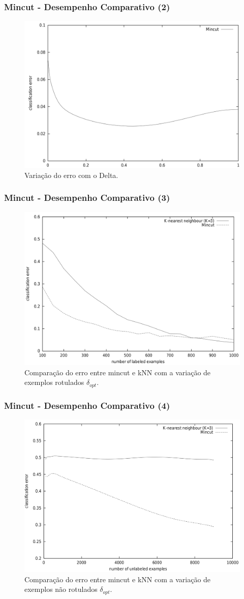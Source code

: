 \documentclass{beamer}
\begin{document}
    \frame
    {
      \frametitle{Mincut - Desempenho Comparativo (2)}
      \begin{figure}[!h]
        \begin{center}
                \includegraphics[width=.5\textwidth]{mincut-delta}
        \end{center}
        \caption{Variação do erro com o Delta.}
      \end{figure}
    }

    \frame
    {
      \frametitle{Mincut - Desempenho Comparativo (3)}
      \begin{figure}[!h]
        \begin{center}
                \includegraphics[width=.5\textwidth]{mincut-erro-l}
        \end{center}
        \caption{Comparação do erro entre mincut e kNN com a variação de exemplos rotulados $\delta_{opt}$.}
      \end{figure}
    }

    \frame
    {
      \frametitle{Mincut - Desempenho Comparativo (4)}
      \begin{figure}[!h]
        \begin{center}
                \includegraphics[width=.8\textwidth]{mincut-erro-u}
        \end{center}
        \caption{Comparação do erro entre mincut e kNN com a variação de exemplos não rotulados $\delta_{opt}$.}
      \end{figure}
    }
\end{document}
